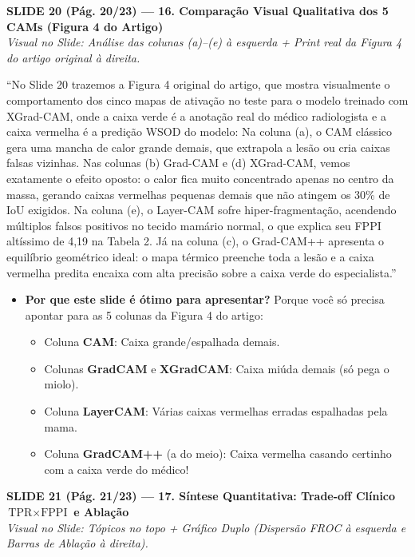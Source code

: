 \documentclass[11pt,a4paper]{article}
\newcommand{\slideheader}[3]{%
    \vspace{10pt}%
    \begin{tcolorbox}[colback=slateborder, colframe=slateborder, coltext=white, boxrule=0pt, arc=3pt, left=8pt, right=8pt, top=5pt, bottom=5pt]
        {\large\bfseries #1 — #2}\\[2pt]
        {\small\itshape Visual no Slide: #3}
    \end{tcolorbox}%
}
\newenvironment{falabox}{%
    \begin{tcolorbox}[colback=speechbg, colframe=speechborder, boxrule=1.2pt, arc=4pt, left=10pt, right=10pt, top=8pt, bottom=8pt, title={\bfseries O QUE VOCÊ DEVE FALAR (Fala Sugerida)}]%
}{%
    \end{tcolorbox}%
}
\newenvironment{explicabox}{%
    \begin{tcolorbox}[colback=explainbg, colframe=explainborder, boxrule=0.8pt, arc=4pt, left=10pt, right=10pt, top=8pt, bottom=8pt, title={\bfseries ENTENDA O QUE VOCÊ ESTÁ FALANDO (Explicação Didática de Cada Termo)}]%
}{%
    \end{tcolorbox}%
}
\begin{document}
\newpage
\slideheader{SLIDE 20 (Pág. 20/23)}{16. Comparação Visual Qualitativa dos 5 CAMs (Figura 4 do Artigo)}{Análise das colunas (a)–(e) à esquerda + Print real da Figura 4 do artigo original à direita.}

\begin{falabox}
``No Slide 20 trazemos a Figura 4 original do artigo, que mostra visualmente o comportamento dos cinco mapas de ativação no teste para o modelo treinado com XGrad-CAM, onde a caixa verde é a anotação real do médico radiologista e a caixa vermelha é a predição WSOD do modelo:
Na coluna (a), o CAM clássico gera uma mancha de calor grande demais, que extrapola a lesão ou cria caixas falsas vizinhas.
Nas colunas (b) Grad-CAM e (d) XGrad-CAM, vemos exatamente o efeito oposto: o calor fica muito concentrado apenas no centro da massa, gerando caixas vermelhas pequenas demais que não atingem os 30\% de IoU exigidos.
Na coluna (e), o Layer-CAM sofre hiper-fragmentação, acendendo múltiplos falsos positivos no tecido mamário normal, o que explica seu FPPI altíssimo de 4,19 na Tabela 2.
Já na coluna (c), o Grad-CAM++ apresenta o equilíbrio geométrico ideal: o mapa térmico preenche toda a lesão e a caixa vermelha predita encaixa com alta precisão sobre a caixa verde do especialista.''
\end{falabox}

\begin{explicabox}
\begin{itemize}[leftmargin=*, itemsep=4pt]
    \item \textbf{Por que este slide é ótimo para apresentar?} Porque você só precisa apontar para as 5 colunas da Figura 4 do artigo:
    \begin{itemize}
        \item Coluna \textbf{CAM}: Caixa grande/espalhada demais.
        \item Colunas \textbf{GradCAM} e \textbf{XGradCAM}: Caixa miúda demais (só pega o miolo).
        \item Coluna \textbf{LayerCAM}: Várias caixas vermelhas erradas espalhadas pela mama.
        \item Coluna \textbf{GradCAM++} (a do meio): Caixa vermelha casando certinho com a caixa verde do médico!
    \end{itemize}
\end{itemize}
\end{explicabox}

\newpage
\slideheader{SLIDE 21 (Pág. 21/23)}{17. Síntese Quantitativa: Trade-off Clínico $\text{TPR} \times \text{FPPI}$ e Ablação}{Tópicos no topo + Gráfico Duplo (Dispersão FROC à esquerda e Barras de Ablação à direita).}
\end{document}
